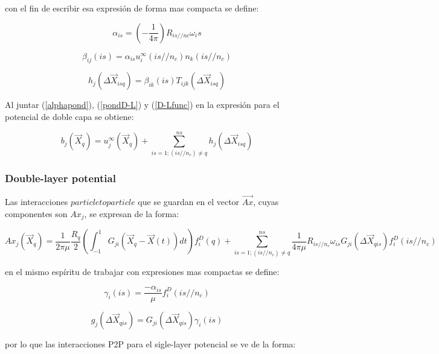 \documentclass[letter,10pt]{article}
\begin{document}
\noindent con el fin de escribir esa expresión de forma mas compacta se define:

\begin{equation}
\alpha_{is} = \left(-\frac{1}{4\pi} \right) R_{is//nc}\omega_is
\label{alphapond}
\end{equation}

\begin{equation}
\beta_{ij}(is) = \alpha_{is}u^{\infty}_i(is//n_c)n_k(is//n_c)
\label{pondD-L}
\end{equation}

\begin{equation}
h_j(\Delta\vec{X}_{isq}) = \beta_{ik}(is) T_{ijk}(\Delta\vec{X}_{isq})
\label{D-Lfunc}
\end{equation}

Al juntar (\ref{alphapond}), (\ref{pondD-L}) y (\ref{D-Lfunc}) en la expresión para el potencial de doble capa se obtiene:

\begin{equation}
b_j(\vec{X}_q) = u_j^{\infty}(\vec{X}_q) + \sum_{is=1; {(is//n_c) \neq q}}^{ns} h_j(\Delta \vec{X}_{isq})
\label{P2PD-L}
\end{equation}

\subsubsection{Double-layer potential}

Las interacciones $particle to particle$ que se guardan en el vector $\vec{Ax}$, cuyas componentes son $Ax_j$, se expresan de la forma:

$$Ax_j(\vec{X}_q)= \frac{1}{2\pi\mu}\frac{R_q}{2}\left(\int_{-1}^1G_{ji}(\vec{X}_q -\vec{X}(t))dt\right)f_i^D(q) +\sum_{is=1; {(is//n_c) \neq q}}^{ns} \frac{1}{4\pi\mu}R_{is//n_c}\omega_{is}G_{ji}(\Delta \vec{X}_{qis})f_i^D(is//n_c) $$

\noindent en el mismo espíritu de trabajar con expresiones mas compactas se define:

\begin{equation}
\gamma_i(is) = \frac{-\alpha_{is}}{\mu}f_i^D(is//n_c)
\label{pondS-L}
\end{equation}

\begin{equation}
g_j(\Delta \vec{X}_{qis}) = G_{ji}(\Delta \vec{X}_{qis})\gamma_i(is)
\label{S-Lfunc}
\end{equation}

\noindent por lo que las interacciones P2P para el sigle-layer potencial se ve de la forma:
\end{document}
